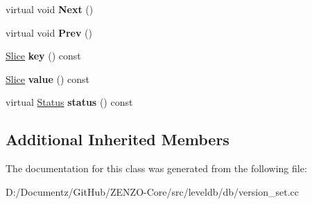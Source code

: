 \begin{DoxyCompactItemize}
\item 
\mbox{\label{classleveldb_1_1_version_1_1_level_file_num_iterator_a7f470d4bd4dd27ff653bd1e61ccfd759}} 
virtual void {\bfseries Next} ()
\item 
\mbox{\label{classleveldb_1_1_version_1_1_level_file_num_iterator_ab39c60a98d579590231034fdb665cb42}} 
virtual void {\bfseries Prev} ()
\item 
\mbox{\label{classleveldb_1_1_version_1_1_level_file_num_iterator_af89babdc6efb44a125b9ec597fc96bd8}} 
\mbox{\hyperlink{classleveldb_1_1_slice}{Slice}} {\bfseries key} () const
\item 
\mbox{\label{classleveldb_1_1_version_1_1_level_file_num_iterator_af7b7da923a316d8b85f7194c926470db}} 
\mbox{\hyperlink{classleveldb_1_1_slice}{Slice}} {\bfseries value} () const
\item 
\mbox{\label{classleveldb_1_1_version_1_1_level_file_num_iterator_a173217ee0e689944ba052b1d07d2e58a}} 
virtual \mbox{\hyperlink{classleveldb_1_1_status}{Status}} {\bfseries status} () const
\end{DoxyCompactItemize}
\subsection*{Additional Inherited Members}


The documentation for this class was generated from the following file\+:\begin{DoxyCompactItemize}
\item 
D\+:/\+Documentz/\+Git\+Hub/\+Z\+E\+N\+Z\+O-\/\+Core/src/leveldb/db/version\+\_\+set.\+cc\end{DoxyCompactItemize}
